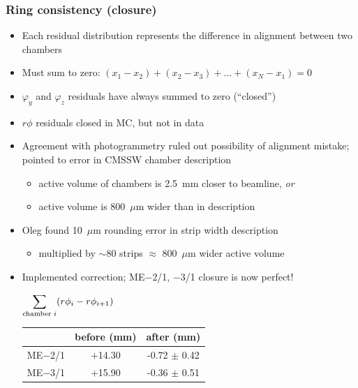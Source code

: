 \documentclass[compress]{beamer}
\begin{document}
\begin{frame}
\frametitle{Ring consistency (closure)}
\begin{itemize}
\item Each residual distribution represents the difference in alignment between two chambers
\item Must sum to zero: $(x_1 - x_2) + (x_2 - x_3) + \ldots + (x_N - x_1) = 0$
\item $\varphi_y$ and $\varphi_z$ residuals have always summed to zero (``closed'')
\item $r\phi$ residuals closed in MC, but not in data
\item Agreement with photogrammetry ruled out possibility of alignment
  mistake; pointed to error in CMSSW chamber description
\begin{itemize}
\item active volume of chambers is 2.5~mm closer to beamline, {\it or}
\item active volume is 800~$\mu$m wider than in description
\end{itemize}
\item Oleg found 10~$\mu$m rounding error in strip width description
\begin{itemize}
\item multiplied by $\sim$80 strips $\approx$ 800~$\mu$m wider active volume
\end{itemize}
\item Implemented correction; ME$-$2/1, $-$3/1 closure is now perfect!

\begin{center}
\hspace{-1 cm} $\displaystyle \sum_{\mbox{\scriptsize chamber }i} (r\phi_i - r\phi_{i+1})$ \hspace{0.3 cm}
\begin{tabular}{c c c}
& before (mm) & after (mm) \\\hline
ME$-$2/1 & $+$14.30 & -0.72 $\pm$ 0.42 \\
ME$-$3/1 & $+$15.90 & -0.36 $\pm$ 0.51 \\
\end{tabular}
\end{center}

\end{itemize}
\end{frame}
\end{document}
